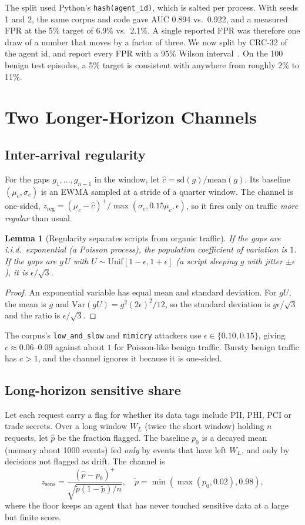 \documentclass[conference]{IEEEtran}
\newtheorem{lemma}{Lemma}
\theoremstyle{remark}
\begin{document}
The split used Python's \texttt{hash(agent\_id)}, which is salted per process. With seeds 1 and 2, the same corpus and code gave AUC 0.894 vs.\ 0.922, and a measured FPR at the 5\% target of 6.9\% vs.\ 2.1\%. A single reported FPR was therefore one draw of a number that moves by a factor of three. We now split by CRC-32 of the agent id, and report every FPR with a 95\% Wilson interval~\cite{wilson1927,brown2001}. On the 100 benign test episodes, a 5\% target is consistent with anywhere from roughly 2\% to 11\%.

\section{Two Longer-Horizon Channels}\label{sec:channels}
\subsection{Inter-arrival regularity}
For the gaps $g_1,\dots,g_{n-1}$ in the window, let $\hat c=\mathrm{sd}(g)/\mathrm{mean}(g)$. Its baseline $(\mu_c,\sigma_c)$ is an EWMA sampled at a stride of a quarter window. The channel is one-sided, $z_{\mathrm{reg}}=(\mu_c-\hat c)^+/\max(\sigma_c,0.15\mu_c,\epsilon)$, so it fires only on traffic \emph{more regular} than usual.

\begin{lemma}[Regularity separates scripts from organic traffic]\label{lem:cv}
If the gaps are i.i.d.\ exponential (a Poisson process), the population coefficient of variation is $1$. If the gaps are $g\,U$ with $U\sim\mathrm{Unif}[1-\epsilon,1+\epsilon]$ (a script sleeping $g$ with jitter $\pm\epsilon$), it is $\epsilon/\sqrt3$.
\end{lemma}
\begin{proof}
An exponential variable has equal mean and standard deviation. For $gU$, the mean is $g$ and $\mathrm{Var}(gU)=g^2(2\epsilon)^2/12$, so the standard deviation is $g\epsilon/\sqrt3$ and the ratio is $\epsilon/\sqrt3$.
\end{proof}
The corpus's \texttt{low\_and\_slow} and \texttt{mimicry} attackers use $\epsilon\in\{0.10,0.15\}$, giving $c\approx0.06$--$0.09$ against about $1$ for Poisson-like benign traffic. Bursty benign traffic has $c>1$, and the channel ignores it because it is one-sided.

\subsection{Long-horizon sensitive share}
Let each request carry a flag for whether its data tags include PII, PHI, PCI or trade secrets. Over a long window $W_L$ (twice the short window) holding $n$ requests, let $\hat p$ be the fraction flagged. The baseline $p_0$ is a decayed mean (memory about 1000 events) fed \emph{only} by events that have left $W_L$, and only by decisions not flagged as drift. The channel is
\begin{equation}
z_{\mathrm{sens}}=\frac{(\hat p-p_0)^+}{\sqrt{\tilde p(1-\tilde p)/n}},\quad \tilde p=\min(\max(p_0,0.02),0.98),\label{eq:zsens}
\end{equation}
where the floor keeps an agent that has never touched sensitive data at a large but finite score.
\end{document}
